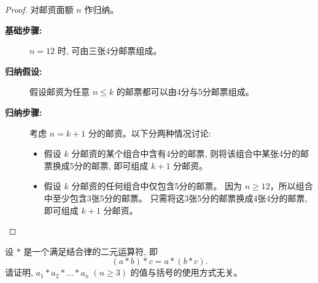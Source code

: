 \documentclass[a4paper, justified]{tufte-handout}
\begin{document}
\begin{proof}
  对邮资面额 $n$ 作归纳。
  \begin{description}
    \item[{\bf 基础步骤:}] $n = 12$ 时, 可由三张4分邮票组成。
    \item[{\bf 归纳假设:}] 假设邮资为任意 $n \le k$ 的邮票都可以由4分与5分邮票组成。
    \item[{\bf 归纳步骤:}] 考虑 $n = k + 1$ 分的邮资。以下分两种情况讨论:
      \begin{itemize}
        \item 假设 $k$ 分邮资的某个组合中含有4分的邮票,
          则将该组合中某张4分的邮票换成5分的邮票, 即可组成 $k+1$ 分邮资。
        \item 假设 $k$ 分邮资的任何组合中仅包含5分的邮票。
          因为 $n \ge 12$，所以组合中至少包含3张5分的邮票。
          只需将这3张5分的邮票换成4张4分的邮票, 即可组成 $k+1$ 分邮资。
      \end{itemize}
  \end{description}
\end{proof}

\begin{problem}
  设 $\ast$ 是一个满足结合律的二元运算符, 即
  \[
    (a \ast b) \ast c = a \ast (b \ast c).
  \]
  请证明, $a_{1} \ast a_{2} \ast \dots \ast a_{n}\; (n \ge 3)$
  的值与括号的使用方式无关。
\end{problem}
\end{document}
